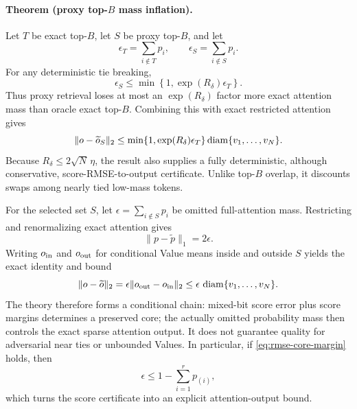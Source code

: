 \paragraph{Theorem (proxy top-$B$ mass inflation).}
Let $T$ be exact top-$B$, let $S$ be proxy top-$B$, and let
\begin{equation}
 \epsilon_T=\sum_{i\notin T}p_i,\qquad
 \epsilon_S=\sum_{i\notin S}p_i .
\end{equation}
For any deterministic tie breaking,
\begin{equation}
 \epsilon_S\le
 \min\!\left\{1,\exp(R_\delta)\epsilon_T\right\}.
 \label{eq:proxy-topb-mass-inflation}
\end{equation}
Thus proxy retrieval loses at most an $\exp(R_\delta)$ factor more exact
attention mass than oracle exact top-$B$.  Combining this with exact
restricted attention gives
\begin{equation}
 \|o-\widetilde o_S\|_2
 \le
 \min\!\left\{1,\exp(R_\delta)\epsilon_T\right\}
 \operatorname{diam}\{v_1,\ldots,v_N\}.
 \label{eq:proxy-topb-output-bound}
\end{equation}
Because $R_\delta\le2\sqrt N\,\eta$, the result also supplies a fully
deterministic, although conservative, score-RMSE-to-output certificate.
Unlike top-$B$ overlap, it discounts swaps among nearly tied low-mass tokens.

For the selected set $S$, let
$\epsilon=\sum_{i\notin S}p_i$ be omitted full-attention mass.
Restricting and renormalizing exact attention gives
\begin{equation}
 \|p-\widetilde p\|_1=2\epsilon.
 \label{eq:l1-mass}
\end{equation}
Writing $o_{\rm in}$ and $o_{\rm out}$ for conditional Value means inside and
outside $S$ yields the exact identity and bound
\begin{equation}
 \|o-\widetilde o\|_2
 =\epsilon\|o_{\rm out}-o_{\rm in}\|_2
 \le\epsilon\,\operatorname{diam}\{v_1,\ldots,v_N\}.
 \label{eq:output-mass}
\end{equation}
The theory therefore forms a conditional chain:
mixed-bit score error plus score margins determines a preserved core;
the actually omitted probability mass then controls the exact sparse
attention output.
It does not guarantee quality for adversarial near ties or unbounded Values.
In particular, if \cref{eq:rmse-core-margin} holds, then
\begin{equation}
 \epsilon\le1-\sum_{i=1}^{r}p_{(i)},
 \label{eq:certified-mass}
\end{equation}
which turns the score certificate into an explicit attention-output bound.

